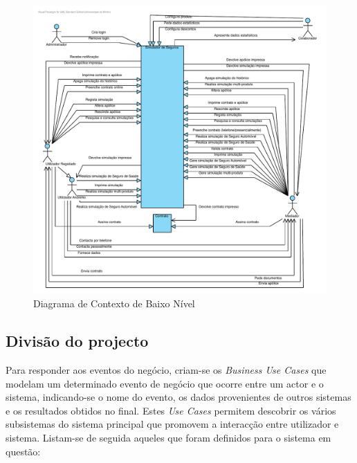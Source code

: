 \begin{itemize}
\begin{figure}[!htb]
	\centering
	\includegraphics[scale=0.9]{images/DiagramaContextoBaixoNivel}
	\caption{Diagrama de Contexto de Baixo Nível}
\end{figure}

\end{itemize}

\subsection{Divisão do projecto}

Para responder aos eventos do negócio, criam-se os \emph{Business Use Cases} que modelam um determinado evento de negócio que ocorre entre um actor e o sistema, indicando-se o nome do evento, os dados provenientes de outros sistemas e os resultados obtidos no final. Estes \emph{Use Cases} permitem descobrir os vários subsistemas do sistema principal que promovem a interacção entre utilizador e sistema. Listam-se de seguida aqueles que foram definidos para o sistema em questão:

